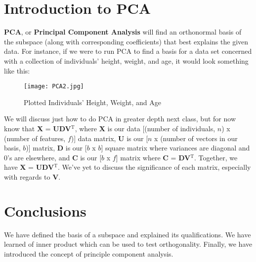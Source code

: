 \documentclass{article}
\theoremstyle{definition}
\begin{document}
\section{Introduction to PCA}
\textbf{PCA}, or \textbf{Principal Component Analysis} will find an orthonormal basis of the subspace (along with corresponding coefficients) that best explains the given data. For instance, if we were to run PCA to find a basis for a data set concerned with a collection of individuals' height, weight, and age, it would look something like this:\\
\linebreak
\begin{figure}[H]
\texttt{[image: PCA2.jpg]}
\caption{Plotted Individuals' Height, Weight, and Age}
\end{figure}
We will discuss just how to do PCA in greater depth next class, but for now know that \textbf{X} = \textbf{UDV}$^{\text{T}}$, where \textbf{X} is our data [(number of individuals, $n$) x (number of features, $f$)] data matrix, \textbf{U} is our [$n$ x  (number of vectors in our basis, $b$)] matrix, \textbf{D} is our [$b$ x $b$] square matrix where variances are diagonal and 0's are elsewhere, and \textbf{C} is our [$b$ x $f$] matrix where \textbf{C} = \textbf{DV}$^{\text{T}}$. Together, we have \textbf{X} = \textbf{UDV}$^{\text{T}}$. We've yet to discuss the significance of each matrix, especially with regards to \textbf{V}.
\section{Conclusions}
We have defined the basis of a subspace and explained its qualifications. We have learned of inner product which can be used to test orthogonality. Finally, we have introduced the concept of principle component analysis. 
\end{document}
